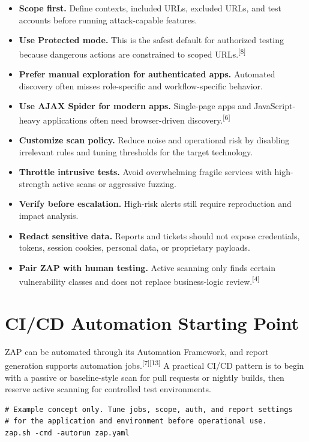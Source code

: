 \documentclass[11pt]{article}
\newcommand{\term}[1]{\textbf{#1}}
\newcommand{\source}[1]{\textsuperscript{[#1]}}
\begin{document}
\begin{itemize}
  \item \term{Scope first.} Define contexts, included URLs, excluded URLs, and test accounts before running attack-capable features.
  \item \term{Use Protected mode.} This is the safest default for authorized testing because dangerous actions are constrained to scoped URLs.\source{8}
  \item \term{Prefer manual exploration for authenticated apps.} Automated discovery often misses role-specific and workflow-specific behavior.
  \item \term{Use AJAX Spider for modern apps.} Single-page apps and JavaScript-heavy applications often need browser-driven discovery.\source{6}
  \item \term{Customize scan policy.} Reduce noise and operational risk by disabling irrelevant rules and tuning thresholds for the target technology.
  \item \term{Throttle intrusive tests.} Avoid overwhelming fragile services with high-strength active scans or aggressive fuzzing.
  \item \term{Verify before escalation.} High-risk alerts still require reproduction and impact analysis.
  \item \term{Redact sensitive data.} Reports and tickets should not expose credentials, tokens, session cookies, personal data, or proprietary payloads.
  \item \term{Pair ZAP with human testing.} Active scanning only finds certain vulnerability classes and does not replace business-logic review.\source{4}
\end{itemize}

\section{CI/CD Automation Starting Point}

ZAP can be automated through its Automation Framework, and report generation supports automation jobs.\source{7}\source{13} A practical CI/CD pattern is to begin with a passive or baseline-style scan for pull requests or nightly builds, then reserve active scanning for controlled test environments.

\begin{lstlisting}
# Example concept only. Tune jobs, scope, auth, and report settings
# for the application and environment before operational use.
zap.sh -cmd -autorun zap.yaml
\end{lstlisting}
\end{document}
